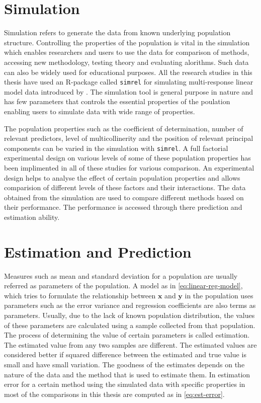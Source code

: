\documentclass[11pt,twoside,openright,titlepage,
  headinclude,footinclude,BCOR=5mm,
  numbers=noenddot,cleardoublepage=empty,
  tablecaptionabove, dottedtoc,
  bibliography=totoc]{scrreprt}
\begin{document}
\hypertarget{simulation}{%
\section{Simulation}\label{simulation}}

Simulation refers to generate the data from known underlying population structure. Controlling the properties of the population is vital in the simulation which enables researchers and users to use the data for comparison of methods, accessing new methodology, testing theory and evaluating alorithms. Such data can also be widely used for educational purposes. All the research studies in this thesis have used an R-package called \texttt{simrel} for simulating multi-response linear model data introduced by \citet{RIMAL20181}. The simulation tool is general purpose in nature and has few parameters that controls the essential properties of the poulation enabling users to simulate data with wide range of properties.

The population properties such as the coefficient of determination, number of relevant predictors, level of multicollinerity and the position of relevant principal components can be varied in the simulation with \texttt{simrel}. A full factorial experimental design on various levels of some of these population properties has been implimented in all of these studies for various comparison. An experimental design helps to analyse the effect of certain population properties and allows comparision of different levels of these factors and their interactions. The data obtained from the simulation are used to compare different methods based on their performance. The performance is accessed through there prediction and estimation ability.

\hypertarget{estimation-and-prediction}{%
\section{Estimation and Prediction}\label{estimation-and-prediction}}

Measures such as mean and standard deviation for a population are usually referred as parameters of the population. A model as in \eqref{eq:linear-reg-model}, which tries to formulate the relationship between \(\mathbf{x}\) and \(\mathbf{y}\) in the population uses parameters such as the error variance and regression coefficients are also terms as parameters. Usually, due to the lack of known population distribution, the values of these parameters are calculated using a sample collected from that population. The process of determining the value of certain parameters is called estimation. The estimated value from any two samples are different. The estimated values are considered better if squared difference between the estimated and true value is small and have small variation. The goodness of the estimates depends on the nature of the data and the method that is used to estimate them. In estimation error for a certain method using the simulated data with specific properties in most of the comparisons in this thesis are computed as in \eqref{eq:est-error}.
\end{document}
